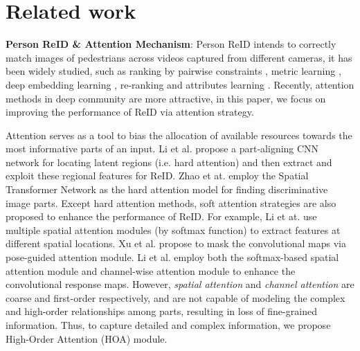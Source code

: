 \documentclass[10pt,twocolumn,letterpaper]{article}
\begin{document}
\section{Related work}
\textbf{Person ReID \& Attention Mechanism}: Person ReID intends to correctly match images of pedestrians across videos captured from different cameras, it has been widely studied, such as ranking by pairwise constraints \cite{paisitkriangkrai2015learning,wang2014person}, metric learning \cite{yi2014deep,xiong2014person}, deep embedding learning \cite{zheng2016person,sun2018beyond}, re-ranking \cite{zheng2015query,garcia2015person} and attributes learning \cite{su2016deep,zhao2014learning}. Recently, attention methods \cite{chen2017sca,xu2015show,hu2018squeeze,vaswani2017attention} in deep community are more attractive, in this paper, we focus on improving the performance of ReID via attention strategy.

Attention serves as a tool to bias the allocation of available resources towards the most informative parts of an input. Li et al. \cite{li2017learning} propose a part-aligning CNN network for locating latent regions (i.e. hard attention) and then extract and exploit these regional features for ReID. Zhao et at. \cite{zhao2017deeply} employ the Spatial Transformer Network \cite{jaderberg2015spatial} as the hard attention model for finding discriminative image parts. Except hard attention methods, soft attention strategies are also proposed to enhance the performance of ReID. For example, Li et at. \cite{li2018diversity} use multiple spatial attention modules (by softmax function) to extract features at different spatial locations. Xu et al. \cite{xu2018attention} propose to mask the convolutional maps via pose-guided attention module. Li et al. \cite{li2018harmonious} employ both the softmax-based spatial attention module and channel-wise attention module \cite{hu2018squeeze} to enhance the convolutional response maps. However, \emph{spatial attention} and \emph{channel attention} are coarse and first-order respectively, and are not capable of modeling the complex and high-order relationships among parts, resulting in loss of fine-grained information. Thus, to capture detailed and complex information, we propose High-Order Attention (HOA) module.
\end{document}
